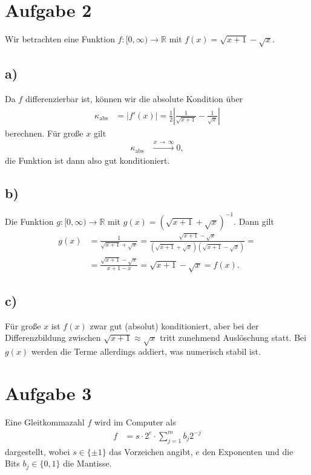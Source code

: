 \documentclass[english, parskip=full]{scrartcl}
\newcommand{\kla}{}
\newcommand{\tecxt}{}
\begin{document}
 
\newpage
\section*{Aufgabe 2}
Wir betrachten eine Funktion $f : [0,\infty) \rightarrow \mathbb{R}$ mit $f(x) = \sqrt{x+1} - \sqrt{x}$.
\subsection*{a)}
Da $f$ differenzierbar ist, können wir die absolute Kondition über 
\begin{align}
\kappa_\tecxt\text{abs} &= |f'(x)| = \frac{1}{2} \left\vert\frac{1}{\sqrt{x+1}} - \frac{1}{\sqrt{x}} \right\vert
\end{align}
berechnen.
Für große $x$ gilt
\begin{align}
\kappa_\tecxt\text{abs} &\overset{x\,\rightarrow\,\infty }{\longrightarrow} 0,
\end{align}
die Funktion ist dann also gut konditioniert.

\subsection*{b)}
Die Funktion $g : [0,\infty) \rightarrow \mathbb{R}$ mit $g(x) = \kla\left( \sqrt{x+1} + \sqrt{x} \right)^{-1} $.
Dann gilt
\begin{align}
g(x) &= \frac{1}{\sqrt{x+1} + \sqrt{x}} = \frac{\sqrt{x+1} - \sqrt{x}}{\kla\left( \sqrt{x+1} + \sqrt{x} \right)\kla\left( \sqrt{x+1} - \sqrt{x} \right) } = \\
&= \frac{\sqrt{x+1} - \sqrt{x}}{x+1 - x} = \sqrt{x+1} - \sqrt{x} = f(x).
\end{align}


\subsection*{c)}
Für große $x$ ist $f(x)$ zwar gut (absolut) konditioniert, aber bei der Differenzbildung zwischen $\sqrt{x+1}\approx\sqrt{x}$ tritt zunehmend Auslöschung statt.
Bei $g(x)$ werden die Terme allerdings addiert, was numerisch stabil ist.

\newpage
\section*{Aufgabe 3}
Eine Gleitkommazahl $f$ wird im Computer als
\begin{align}
f &= s\cdot 2^e\cdot \sum_{j=1}^m b_j 2^{-j}
\end{align}
dargestellt, wobei $s\in\{\pm 1\}$ das Vorzeichen angibt, $e$ den Exponenten und die Bits $b_j\in\{0,1\}$ die Mantisse.
\end{document}
